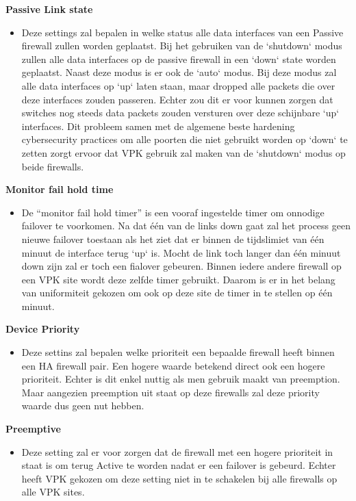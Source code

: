 \textbf{Passive Link state}
    \begin{itemize}[label=\textbullet]
        \item Deze settings zal bepalen in welke status alle data interfaces van een Passive firewall zullen worden geplaatst. Bij het gebruiken van de `shutdown` modus zullen alle data interfaces op de passive firewall in een `down` state worden geplaatst. Naast deze modus is er ook de `auto` modus. Bij deze modus zal alle data interfaces op `up` laten staan, maar dropped alle packets die over deze interfaces zouden passeren. Echter zou dit er voor kunnen zorgen dat switches nog steeds data packets zouden versturen over deze schijnbare `up` interfaces. Dit probleem samen met de algemene beste hardening cybersecurity practices om alle poorten die niet gebruikt worden op `down` te zetten zorgt ervoor dat VPK gebruik zal maken van de `shutdown` modus op beide firewalls.
    \end{itemize}



\textbf{Monitor fail hold time}
    \begin{itemize}[label=\textbullet]
        \item De ``monitor fail hold timer'' is een vooraf ingestelde timer om onnodige failover te voorkomen. Na dat één van de links down gaat zal het process geen nieuwe failover toestaan als het ziet dat er binnen de tijdslimiet van één minuut de interface terug `up` is. Mocht de link toch langer dan één minuut down zijn zal er toch een fialover gebeuren. Binnen iedere andere firewall op een VPK site wordt deze zelfde timer gebruikt. Daarom is er in het belang van uniformiteit gekozen om ook op deze site de timer in te stellen op één minuut.
    \end{itemize}



\textbf{Device Priority}
    \begin{itemize}[label=\textbullet]
        \item Deze settins zal bepalen welke prioriteit een bepaalde firewall heeft binnen een HA firewall pair. Een hogere waarde betekend direct ook een hogere prioriteit. Echter is dit enkel nuttig als men gebruik maakt van preemption. Maar aangezien preemption uit staat op deze firewalls zal deze priority waarde dus geen nut hebben.
    \end{itemize}



\textbf{Preemptive}
    \begin{itemize}[label=\textbullet]
        \item Deze setting zal er voor zorgen dat de firewall met een hogere prioriteit in staat is om terug Active te worden nadat er een failover is gebeurd. Echter heeft VPK gekozen om deze setting niet in te schakelen bij alle firewalls op alle VPK sites.
    \end{itemize}



